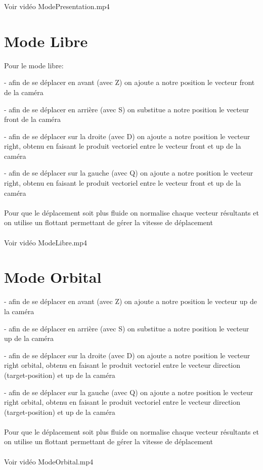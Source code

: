 \documentclass{article}
\begin{document}
Voir vidéo ModePresentation.mp4

\section{Mode Libre}

Pour le mode libre:

- afin de se déplacer en avant (avec Z) on ajoute a notre position le vecteur front de la caméra 

- afin de se déplacer en arrière (avec S) on substitue a notre position le vecteur front de la caméra 

- afin de se déplacer sur la droite (avec D) on ajoute a notre position le vecteur right, obtenu en faisant le produit vectoriel entre le vecteur front et up de la caméra

- afin de se déplacer sur la gauche (avec Q) on ajoute a notre position le vecteur right, obtenu en faisant le produit vectoriel entre le vecteur front et up de la caméra
\\\\
Pour que le déplacement soit plus fluide on normalise chaque vecteur résultants et on utilise un flottant permettant de gérer la vitesse de déplacement
\\\\
Voir vidéo ModeLibre.mp4

\section{Mode Orbital}
- afin de se déplacer en avant (avec Z) on ajoute a notre position le vecteur up de la caméra 

- afin de se déplacer en arrière (avec S) on substitue a notre position le vecteur up de la caméra 

- afin de se déplacer sur la droite (avec D) on ajoute a notre position le vecteur right orbital, obtenu en faisant le produit vectoriel entre le vecteur direction (target-position) et up de la caméra

- afin de se déplacer sur la gauche (avec Q) on ajoute a notre position le vecteur right orbital, obtenu en faisant le produit vectoriel entre le vecteur direction (target-position) et up de la caméra
\\\\
Pour que le déplacement soit plus fluide on normalise chaque vecteur résultants et on utilise un flottant permettant de gérer la vitesse de déplacement
\\\\
Voir vidéo ModeOrbital.mp4
\end{document}
